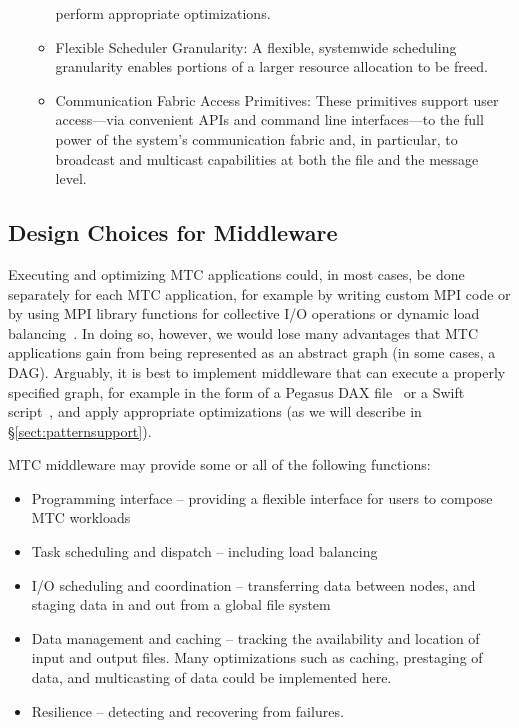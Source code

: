 \documentclass[10pt,letterpaper]{article}
\begin{document}
\begin{itemize}
\begin{itemize}
 perform appropriate optimizations.
\item Flexible Scheduler Granularity:
A flexible, systemwide scheduling granularity enables portions of a larger resource allocation to be freed.
\item Communication Fabric Access Primitives:
These primitives support user access---via convenient APIs and command line interfaces---to the full power of the system's communication fabric and, in particular, to broadcast and multicast capabilities at both the file and the message level.
    \end{itemize}
\end{itemize}




\subsection{Design Choices for Middleware}
\label{sect:middleware-design}
Executing and optimizing MTC applications could, in most cases, be done
separately for each MTC application, for example by writing custom
MPI code or by using MPI library functions for collective I/O operations
or dynamic load balancing~\cite{adlb-09}.
In doing so, however, we would lose many advantages that MTC applications
gain from being represented as an abstract graph (in some cases, a DAG).  Arguably, it is best to
implement middleware that can execute a properly specified graph, for
example in the form of a Pegasus DAX file~\cite{Pegasus_2005} or a Swift script~\cite{swift-ieee09,Swift_2011},
and apply appropriate optimizations (as we will describe in \S\ref{sect:patternsupport}).

MTC middleware may provide some or all of the following functions:
\begin{itemize}
    \item Programming interface -- providing a flexible interface for users to compose MTC workloads
    \item Task scheduling and dispatch -- including load balancing
    \item I/O scheduling and coordination -- transferring data between nodes,
            and staging data in and out from a global file system
    \item Data management and caching -- tracking the availability and location of
            input and output files.  Many optimizations such as
            caching, prestaging of data, and multicasting of data could be implemented
            here.
    \item Resilience -- detecting and recovering from failures.
\end{itemize}
\end{document}
